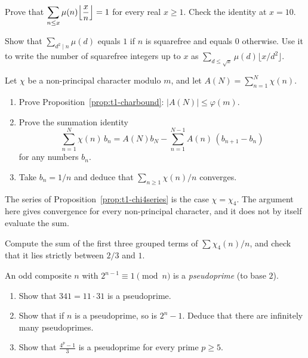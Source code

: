 \begin{exercise}[$\star\star$]\label{ex:t1-mu-floor}
Prove that $\displaystyle\sum_{n\le x}\mu(n)\Bigl\lfloor\frac xn\Bigr\rfloor=1$ for every real $x\ge1$. Check the identity at $x=10$.
\end{exercise}

\begin{exercise}[$\star\star$]\label{ex:t1-squarefree}
Show that $\sum_{d^2\mid n}\mu(d)$ equals $1$ if $n$ is squarefree and equals $0$ otherwise. Use it to write the number of squarefree integers up to $x$ as $\sum_{d\le\sqrt x}\mu(d)\bigl\lfloor x/d^2\bigr\rfloor$.
\end{exercise}

\begin{exercise}[$\star\star\star$]\label{ex:t1-char-series}
Let $\chi$ be a non-principal character modulo $m$, and let $A(N)=\sum_{n=1}^N\chi(n)$.
\begin{enumerate}[label=(\alph*)]
\item Prove Proposition~\ref{prop:t1-charbound}: $|A(N)|\le\varphi(m)$.
\item Prove the summation identity
\[
\sum_{n=1}^N\chi(n)\,b_n=A(N)b_N-\sum_{n=1}^{N-1}A(n)\,(b_{n+1}-b_n)
\]
for any numbers $b_n$.
\item Take $b_n=1/n$ and deduce that $\sum_{n\ge1}\chi(n)/n$ converges.
\end{enumerate}
The series of Proposition~\ref{prop:t1-chi4series} is the case $\chi=\chi_4$. The argument here gives convergence for every non-principal character, and it does not by itself evaluate the sum.
\end{exercise}

\begin{exercise}[$\star$]\label{ex:t1-group3}
Compute the sum of the first three grouped terms of $\sum\chi_4(n)/n$, and check that it lies strictly between $2/3$ and $1$.
\end{exercise}

\begin{exercise}[$\star\star$]\label{pb:pseudo}
An odd composite $n$ with $2^{n-1}\equiv1\pmod n$ is a \emph{pseudoprime} (to base $2$).
\begin{enumerate}[label=(\alph*)]
\item Show that $341=11\cdot31$ is a pseudoprime.
\item Show that if $n$ is a pseudoprime, so is $2^n-1$. Deduce that there are infinitely many pseudoprimes.
\item Show that $\frac{4^p-1}3$ is a pseudoprime for every prime $p\ge5$.
\end{enumerate}
\end{exercise}

